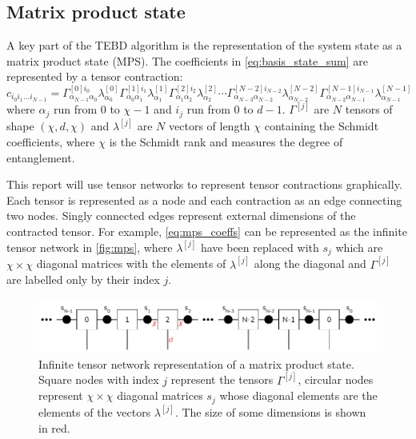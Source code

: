 \documentclass[a4paper, headsepline, footheight=13.6pt]{scrartcl}
\begin{document}
\subsection{Matrix product state} \label{subsec:mps}
A key part of the TEBD algorithm is the representation of the system state as a matrix product state (MPS). The coefficients in \autoref{eq:basis_state_sum} are represented by a tensor contraction:
\begin{equation}
    c_{i_0 i_1 \ldots i_{N-1}} = 
    \Gamma^{[0]i_0}_{\alpha_{N-1}\alpha_0}
    \lambda^{[0]}_{\alpha_0}
    \Gamma^{[1]i_1}_{\alpha_0\alpha_1}
    \lambda^{[1]}_{\alpha_1}
    \Gamma^{[2]i_2}_{\alpha_1\alpha_2}
    \lambda^{[2]}_{\alpha_2}
    \cdots
    \Gamma^{[{N-2}]i_{N-2}}_{\alpha_{N-3}\alpha_{N-2}}
    \lambda^{[N-2]}_{\alpha_{N-2}}
    \Gamma^{[{N-1}]i_{N-1}}_{\alpha_{N-2}\alpha_{N-1}}
    \lambda^{[N-1]}_{\alpha_{N-1}}
    \label{eq:mps_coeffs}
\end{equation}
where $\alpha_j$ run from $0$ to $\chi-1$ and $i_j$ run from $0$ to $d-1$. $\Gamma^{[j]}$ are $N$ tensors of shape $(\chi, d, \chi)$ and $\lambda^{[j]}$ are $N$ vectors of length $\chi$ containing the Schmidt coefficients, where $\chi$ is the Schmidt rank and measures the degree of entanglement.

This report will use tensor networks to represent tensor contractions graphically. Each tensor is represented as a node and each contraction as an edge connecting two nodes. Singly connected edges represent external dimensions of the contracted tensor. For example, \autoref{eq:mps_coeffs} can be represented as the infinite tensor network in \autoref{fig:mps}, where $\lambda^{[j]}$ have been replaced with $s_j$ which are {$\chi \times \chi$} diagonal matrices with the elements of $\lambda^{[j]}$ along the diagonal and $\Gamma^{[j]}$ are labelled only by their index $j$.

\begin{figure}[htbp]
    \centering
    \includegraphics[width=\textwidth]{figures/mps.pdf}
    \caption{Infinite tensor network representation of a matrix product state. Square nodes with index $j$ represent the tensors $\Gamma^{[j]}$, circular nodes represent {$\chi \times \chi$} diagonal matrices $s_j$ whose diagonal elements are the elements of the vectors $\lambda^{[j]}$. The size of some dimensions is shown in red.}
    \label{fig:mps}
\end{figure}
\end{document}
